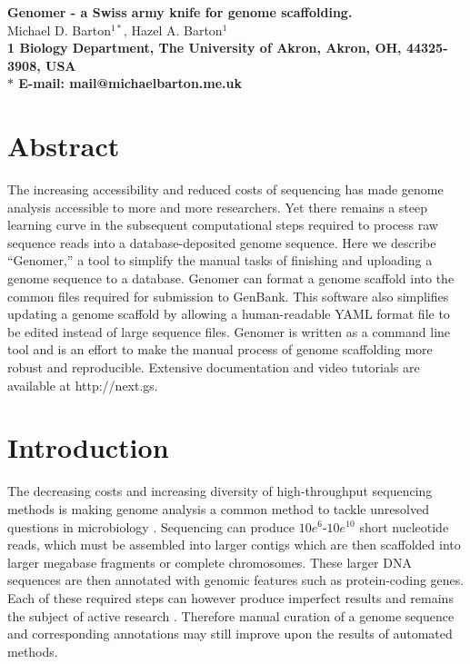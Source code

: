 \documentclass[10pt]{article}
\date{}
\begin{document}
\begin{flushleft}
{\Large
\textbf{Genomer - a Swiss army knife for genome scaffolding.}
}
\\
Michael D. Barton$^{1\ast}$, 
Hazel A. Barton$^{1}$
\\
\bf{1} Biology Department, The University of Akron, Akron, OH, 44325-3908, USA
\\
$\ast$ E-mail: mail@michaelbarton.me.uk
\end{flushleft}

\section*{Abstract}

The increasing accessibility and reduced costs of sequencing has made genome
analysis accessible to more and more researchers. Yet there remains a steep
learning curve in the subsequent computational steps required to process raw
sequence reads into a database-deposited genome sequence. Here we describe
``Genomer,'' a tool to simplify the manual tasks of finishing and uploading a
genome sequence to a database. Genomer can format a genome scaffold into the
common files required for submission to GenBank. This software also simplifies
updating a genome scaffold by allowing a human-readable YAML format file to be
edited instead of large sequence files. Genomer is written as a command line
tool and is an effort to make the manual process of genome scaffolding more
robust and reproducible. Extensive documentation and video tutorials are
available at http://next.gs.

\section*{Introduction}

The decreasing costs and increasing diversity of high-throughput sequencing
methods is making genome analysis a common method to tackle unresolved
questions in microbiology \cite{loman2012b}. Sequencing can produce
$10e^{6}$-$10e^{10}$ short nucleotide reads, which must be assembled into
larger contigs which are then scaffolded into larger megabase fragments or
complete chromosomes. These larger DNA sequences are then annotated with
genomic features such as protein-coding genes. Each of these required steps can
however produce imperfect results and remains the subject of active research
\cite{earl2011,quail2012,beckloff2012}. Therefore manual curation of a genome
sequence and corresponding annotations may still improve upon the results of
automated methods.
\end{document}
